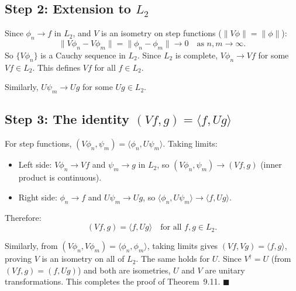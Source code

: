 \documentclass[12pt]{article}
\begin{document}
\subsection*{Step 2: Extension to $L_2$}

Since $\phi_n \to f$ in $L_2$, and $V$ is an isometry on step functions ($\|V\phi\| = \|\phi\|$):
\[
\|V\phi_n - V\phi_m\| = \|\phi_n - \phi_m\| \to 0 \quad \text{as } n, m \to \infty.
\]
So $\{V\phi_n\}$ is a Cauchy sequence in $L_2$. Since $L_2$ is complete, $V\phi_n \to Vf$ for some $Vf \in L_2$. This defines $Vf$ for all $f \in L_2$.

Similarly, $U\psi_m \to Ug$ for some $Ug \in L_2$.

\subsection*{Step 3: The identity $(Vf, g) = \langle f, Ug\rangle$}

For step functions, $(V\phi_n, \psi_m) = \langle\phi_n, U\psi_m\rangle$. Taking limits:
\begin{itemize}
\item Left side: $V\phi_n \to Vf$ and $\psi_m \to g$ in $L_2$, so $(V\phi_n, \psi_m) \to (Vf, g)$ (inner product is continuous).
\item Right side: $\phi_n \to f$ and $U\psi_m \to Ug$, so $\langle\phi_n, U\psi_m\rangle \to \langle f, Ug\rangle$.
\end{itemize}

Therefore:
\[
\boxed{(Vf, g) = \langle f, Ug\rangle \quad \text{for all } f, g \in L_2}.
\]

Similarly, from $(V\phi_n, V\phi_m) = \langle\phi_n, \phi_m\rangle$, taking limits gives $(Vf, Vg) = \langle f, g\rangle$, proving $V$ is an isometry on all of $L_2$. The same holds for $U$. Since $V^\dagger = U$ (from $(Vf,g) = (f, Ug)$) and both are isometries, $U$ and $V$ are unitary transformations. This completes the proof of Theorem~9.11. \hfill $\blacksquare$
\end{document}
